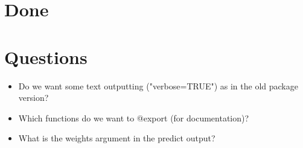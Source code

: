 \documentclass[12pt]{article}
\begin{document}
\section{Done}


\section{Questions}

\begin{itemize}
    \item Do we want some text outputting ("verbose=TRUE") as in the old package version?
    \item Which functions do we want to @export (for documentation)?
    \item What is the weights argument in the predict output?
\end{itemize}
\end{document}
